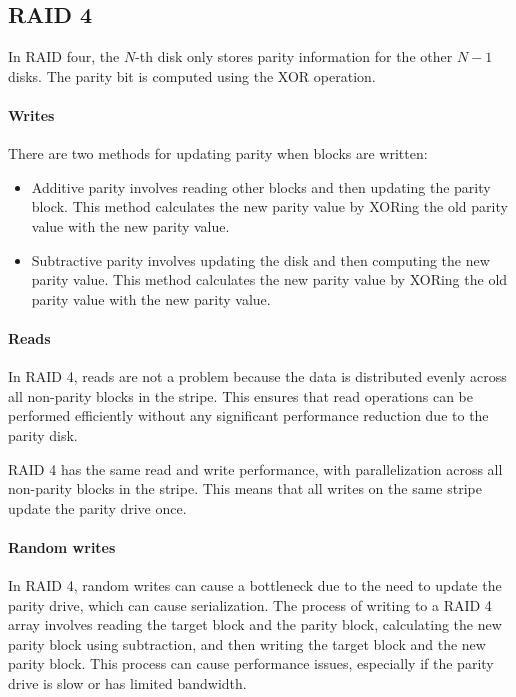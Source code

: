 \subsection{RAID 4}

In RAID four, the $N$-th disk only stores parity information for the other $N-1$ disks. 
The parity bit is computed using the XOR operation.

\paragraph*{Writes}
There are two methods for updating parity when blocks are written:
\begin{itemize}
    \item Additive parity involves reading other blocks and then updating the parity block. 
        This method calculates the new parity value by XORing the old parity value with the new parity value.
    \item Subtractive parity involves updating the disk and then computing the new parity value. 
        This method calculates the new parity value by XORing the old parity value with the new parity value.
\end{itemize}

\paragraph*{Reads}
In RAID 4, reads are not a problem because the data is distributed evenly across all non-parity blocks in the stripe. 
This ensures that read operations can be performed efficiently without any significant performance reduction due to the parity disk.

RAID 4 has the same read and write performance, with parallelization across all non-parity blocks in the stripe. 
This means that all writes on the same stripe update the parity drive once.

\paragraph*{Random writes}
In RAID 4, random writes can cause a bottleneck due to the need to update the parity drive, which can cause serialization. 
The process of writing to a RAID 4 array involves reading the target block and the parity block, calculating the new parity block using subtraction, and then writing the target block and the new parity block. 
This process can cause performance issues, especially if the parity drive is slow or has limited bandwidth.

